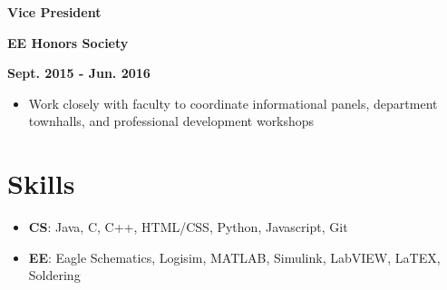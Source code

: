 \documentclass[12pt]{article}
\newcommand\textbox[1]{\parbox{.333\textwidth}{#1}}
\newcommand{\textlcr}[3]{\textbox{\textbf{#1}\hfill}\textbox{\hfil \textbf{#2}\hfil}\textbox{\hfill \textbf{#3}}}
\begin{document}
\textlcr{Vice President}{EE Honors Society}{Sept. 2015 - Jun. 2016}
\begin{itemize}
\item Work closely with faculty to coordinate informational panels, department townhalls, and professional development workshops
\end{itemize}

\section*{Skills}
\vspace*{-1em}\makebox[\linewidth]{\rule{\textwidth}{0.4pt}}
\begin{itemize}
\item \textbf{CS}: Java, C, C++, HTML/CSS, Python, Javascript, Git
\item \textbf{EE}: Eagle Schematics, Logisim, MATLAB, Simulink, LabVIEW, LaTEX, Soldering
\end{itemize}
\end{document}
